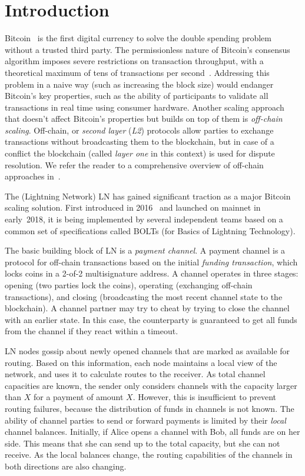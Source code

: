 \section{Introduction} \label{sec:introduction}
Bitcoin~\cite{Nakamoto2008} is the first digital currency to solve the double spending problem without a trusted third party.
The permissionless nature of Bitcoin's consensus algorithm imposes severe restrictions on transaction throughput, with a theoretical maximum of tens of transactions per second~\cite{Croman2016}.
Addressing this problem in a naive way (such as increasing the block size) would endanger Bitcoin's key properties, such as the ability of participants to validate all transactions in real time using consumer hardware.
Another scaling approach that doesn't affect Bitcoin's properties but builds on top of them is \textit{off-chain scaling}.
Off-chain, or \textit{second layer} (\textit{L2}) protocols allow parties to exchange transactions without broadcasting them to the blockchain, but in case of a conflict the blockchain (called \textit{layer one} in this context) is used for dispute resolution.
We refer the reader to a comprehensive overview of off-chain approaches in~\cite{Gudgeon2019}.

The (Lightning Network) LN has gained significant traction as a major Bitcoin scaling solution.
First introduced in 2016~\cite{Poon2016} and launched on mainnet in early~2018, it is being implemented by several independent teams based on a common set of specifications called BOLTs (for Basics of Lightning Technology).

The basic building block of LN is a \textit{payment channel}.
A payment channel is a protocol for off-chain transactions based on the initial \textit{funding transaction}, which locks coins in a 2-of-2 multisignature address.
A channel operates in three stages: opening (two parties lock the coins), operating (exchanging off-chain transactions), and closing (broadcasting the most recent channel state to the blockchain).
A channel partner may try to cheat by trying to close the channel with an earlier state.
In this case, the counterparty is guaranteed to get all funds from the channel if they react within a timeout.

LN nodes gossip about newly opened channels that are marked as available for routing.
Based on this information, each node maintains a local view of the network, and uses it to calculate routes to the receiver.
As total channel capacities are known, the sender only considers channels with the capacity larger than $X$ for a payment of amount $X$.
However, this is insufficient to prevent routing failures, because the distribution of funds in channels is not known.
The ability of channel parties to send or forward payments is limited by their \textit{local} channel balances.
Initially, if Alice opens a channel with Bob, all funds are on her side.
This means that she can send up to the total capacity, but she can not receive.
As the local balances change, the routing capabilities of the channels in both directions are also changing.

